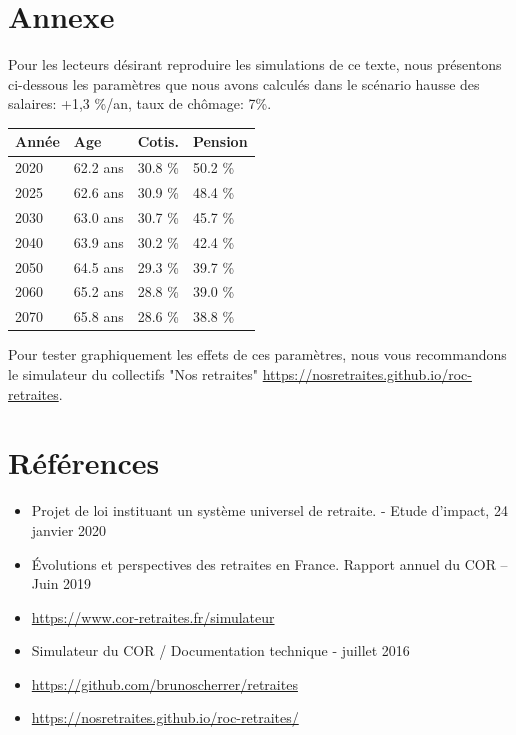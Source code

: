 \documentclass[10pt]{article}
\begin{document}

\section{Annexe}

Pour les lecteurs désirant reproduire les simulations de ce texte, 
nous présentons ci-dessous les paramètres que nous avons calculés dans 
le scénario hausse des salaires: +1,3 \%/an, taux de chômage: 7\%.

\begin{center}
\begin{tabular}{l|lll}
\textbf{Année} & \textbf{Age} & \textbf{Cotis.} & \textbf{Pension} \\
\hline
 2020 & 62.2 ans & 30.8 \% & 50.2 \% \\
 2025 & 62.6 ans & 30.9 \% & 48.4 \% \\
 2030 & 63.0 ans & 30.7 \% & 45.7 \% \\
 2040 & 63.9 ans & 30.2 \% & 42.4 \% \\
 2050 & 64.5 ans & 29.3 \% & 39.7 \% \\
 2060 & 65.2 ans & 28.8 \% & 39.0 \% \\
 2070 & 65.8 ans & 28.6 \% & 38.8 \%
\end{tabular}
\end{center}

Pour tester graphiquement les effets de ces paramètres, nous vous recommandons le 
simulateur du collectifs "Nos retraites" \url{https://nosretraites.github.io/roc-retraites}. 


\section{Références}

\begin{itemize}
\item Projet de loi instituant un système universel de retraite. - Etude d'impact, 24 janvier 2020
\item Évolutions et perspectives des retraites en France. Rapport annuel du COR – Juin 2019
\item \url{https://www.cor-retraites.fr/simulateur}
\item Simulateur du COR / Documentation technique - juillet 2016
\item \url{https://github.com/brunoscherrer/retraites}
\item \url{https://nosretraites.github.io/roc-retraites/}
\end{itemize}
\end{document}

